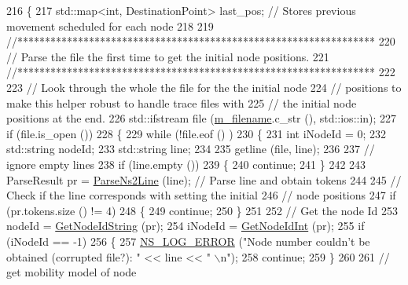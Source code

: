 \begin{DoxyCode}
216 \{
217   std::map<int, DestinationPoint> last\_pos;    \textcolor{comment}{// Stores previous movement scheduled for each node}
218 
219   \textcolor{comment}{//*****************************************************************}
220   \textcolor{comment}{// Parse the file the first time to get the initial node positions.}
221   \textcolor{comment}{//*****************************************************************}
222 
223   \textcolor{comment}{// Look through the whole the file for the the initial node}
224   \textcolor{comment}{// positions to make this helper robust to handle trace files with}
225   \textcolor{comment}{// the initial node positions at the end.}
226   std::ifstream file (\hyperlink{classns3_1_1Ns2MobilityHelper_a788b7d060c9c7c853f227e9315378316}{m\_filename}.c\_str (), std::ios::in);
227   \textcolor{keywordflow}{if} (file.is\_open ())
228     \{
229       \textcolor{keywordflow}{while} (!file.eof () )
230         \{
231           \textcolor{keywordtype}{int}         iNodeId = 0;
232           std::string nodeId;
233           std::string line;
234 
235           getline (file, line);
236 
237           \textcolor{comment}{// ignore empty lines}
238           \textcolor{keywordflow}{if} (line.empty ())
239             \{
240               \textcolor{keywordflow}{continue};
241             \}
242 
243           ParseResult pr = \hyperlink{namespacens3_a675ca86d3b63bf614be1139b5bf1f2b3}{ParseNs2Line} (line); \textcolor{comment}{// Parse line and obtain tokens}
244 
245           \textcolor{comment}{// Check if the line corresponds with setting the initial}
246           \textcolor{comment}{// node positions}
247           \textcolor{keywordflow}{if} (pr.tokens.size () != 4)
248             \{
249               \textcolor{keywordflow}{continue};
250             \}
251 
252           \textcolor{comment}{// Get the node Id}
253           nodeId  = \hyperlink{namespacens3_af4795da6a0f7062b1e74ceda3414e457}{GetNodeIdString} (pr);
254           iNodeId = \hyperlink{namespacens3_aeb754d89802287943c5dafeb7ba4e1ba}{GetNodeIdInt} (pr);
255           \textcolor{keywordflow}{if} (iNodeId == -1)
256             \{
257               \hyperlink{group__logging_ga0261a8db1d4ac5f79417d117634fd455}{NS\_LOG\_ERROR} (\textcolor{stringliteral}{"Node number couldn't be obtained (corrupted file?): "} << line << \textcolor{stringliteral}{"
      \(\backslash\)n"});
258               \textcolor{keywordflow}{continue};
259             \}
260 
261           \textcolor{comment}{// get mobility model of node}

\end{DoxyCode}
